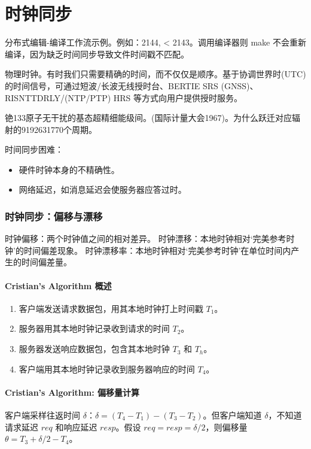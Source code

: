 \section{时钟同步}

分布式编辑-编译工作流示例。例如：2144, < 2143。调用编译器则 make 不会重新编译，因为缺乏时间同步导致文件时间戳不匹配。

物理时钟。有时我们只需要精确的时间，而不仅仅是顺序。基于协调世界时(UTC)的时间信号，可通过短波/长波无线授时台、BERTIE SRS (GNSS)、RISNTTDRLY/(NTP/PTP) HRS 等方式向用户提供授时服务。

铯133原子无干扰的基态超精细能级间。(国际计量大会1967)。为什么跃迁对应辐射的9192631770个周期。

时间同步困难：
\begin{itemize}
\item 硬件时钟本身的不精确性。
\item 网络延迟，如消息延迟会使服务器应答过时。
\end{itemize}

\subsubsection{时钟同步：偏移与漂移}
时钟偏移：两个时钟值之间的相对差异。
时钟漂移：本地时钟相对‘完美参考时钟’的时间偏差现象。
时钟漂移率：本地时钟相对‘完美参考时钟’在单位时间内产生的时间偏差量。

\paragraph{Cristian's Algorithm 概述}
\begin{enumerate}
\item 客户端发送请求数据包，用其本地时钟打上时间戳 $T_1$。
\item 服务器用其本地时钟记录收到请求的时间 $T_2$。
\item 服务器发送响应数据包，包含其本地时钟 $T_3$ 和 $T_h$。
\item 客户端用其本地时钟记录收到服务器响应的时间 $T_4$。
\end{enumerate}

\paragraph{Cristian's Algorithm: 偏移量计算}
客户端采样往返时间 $\delta$：$\delta = (T_4 - T_1) - (T_3 - T_2)$。但客户端知道 $\delta$，不知道请求延迟 $req$ 和响应延迟 $resp$。假设 $req = resp = \delta/2$，则偏移量 $\theta = T_3 + \delta/2 - T_4$。

